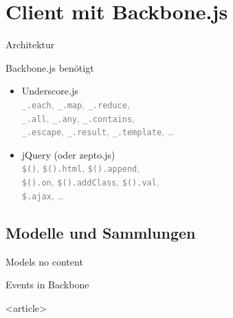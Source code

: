 \section[Client]{Client mit Backbone.js}

\begin{frame}{Architektur}
  \begin{center}
    
  \end{center}
\end{frame}

\begin{frame}{Backbone.js benötigt}
  \begin{itemize}
    \item Underscore.js \\
      \textcolor{gray}{\texttt{\_.each}, \texttt{\_.map},
      \texttt{\_.reduce}, \\
      \texttt{\_.all}, \texttt{\_.any}, \texttt{\_.contains}, \\
      \texttt{\_.escape}, \texttt{\_.result}, \texttt{\_.template},
      \ldots} \\[5ex]
    \item jQuery (oder zepto.js) \\
      \textcolor{gray}{\texttt{\$()}, \texttt{\$().html},
      \texttt{\$().append}, \\
      \texttt{\$().on}, \texttt{\$().addClass}, \texttt{\$().val}, \\
      \texttt{\$.ajax}, \ldots}
  \end{itemize}
\end{frame}

\subsection{Modelle und Sammlungen}

\begin{frame}{Models}
  no content
\end{frame}

\begin{Frame}[fragile]{Events in Backbone}
  \begin{center}
    
  \end{center}
\end{Frame}

\mode
<article>

